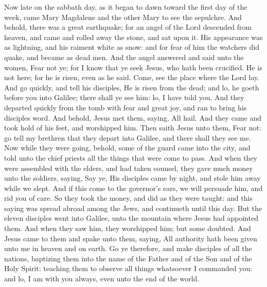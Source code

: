 Now late on the sabbath day, as it began to dawn toward the first day of the week, came Mary Magdalene and the other Mary to see the sepulchre. And behold, there was a great earthquake; for an angel of the Lord descended from heaven, and came and rolled away the stone, and sat upon it. His appearance was as lightning, and his raiment white as snow: and for fear of him the watchers did quake, and became as dead men. And the angel answered and said unto the women, Fear not ye; for I know that ye seek Jesus, who hath been crucified. He is not here; for he is risen, even as he said. Come, see the place where the Lord lay. And go quickly, and tell his disciples, He is risen from the dead; and lo, he goeth before you into Galilee; there shall ye see him: lo, I have told you. And they departed quickly from the tomb with fear and great joy, and ran to bring his disciples word. And behold, Jesus met them, saying, All hail. And they came and took hold of his feet, and worshipped him. Then saith Jesus unto them, Fear not: go tell my brethren that they depart into Galilee, and there shall they see me.  Now while they were going, behold, some of the guard came into the city, and told unto the chief priests all the things that were come to pass. And when they were assembled with the elders, and had taken counsel, they gave much money unto the soldiers, saying, Say ye, His disciples came by night, and stole him away while we slept. And if this come to the governor’s ears, we will persuade him, and rid you of care. So they took the money, and did as they were taught: and this saying was spread abroad among the Jews, and continueth until this day.  But the eleven disciples went into Galilee, unto the mountain where Jesus had appointed them. And when they saw him, they worshipped him; but some doubted. And Jesus came to them and spake unto them, saying, All authority hath been given unto me in heaven and on earth. Go ye therefore, and make disciples of all the nations, baptizing them into the name of the Father and of the Son and of the Holy Spirit: teaching them to observe all things whatsoever I commanded you: and lo, I am with you always, even unto the end of the world. 